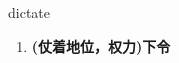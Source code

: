 
\begin{frame}
{\huge dictate}
\begin{center}
\begin{enumerate}\Large
  \item \textbf{(仗着地位，权力)下令}
\end{enumerate}
\end{center}
\end{frame}
